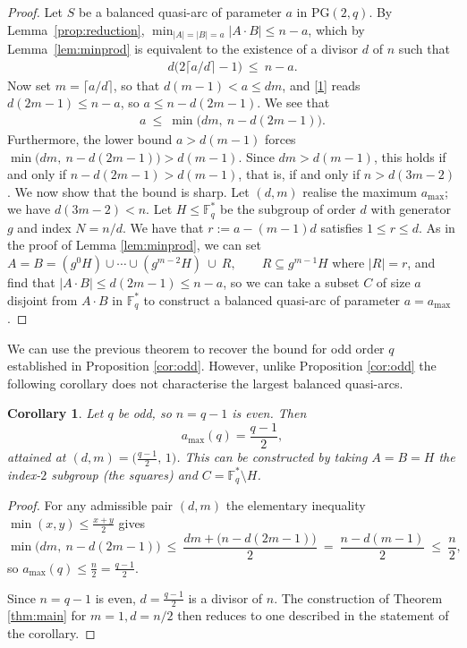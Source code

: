 \documentclass{article}
\newtheorem{corollary}{Corollary}
\newcommand{\PG}{\mathrm{PG}}
\newcommand{\F}{\mathbb{F}}
\begin{document}
\begin{proof} Let $S$ be a balanced quasi-arc of parameter
$a$ in $\PG(2,q)$. By Lemma~\ref{prop:reduction}, $\min_{|A|=|B|=a}|A\cdot B|\le n-a$, which by
Lemma~\ref{lem:minprod} is equivalent to the existence of a divisor $d$ of $n$ such that 
\begin{align}d\bigl(2\lceil a/d\rceil-1\bigr)\ \le\ n-a \label{1}.\end{align}
Now set $m=\lceil a/d\rceil$, so that
  $d(m-1)<a\le dm$, and \eqref{1} reads $d(2m-1)\le n-a$, so $a\le n-d(2m-1)$. We see that
\begin{align}
  a\ \le\ \min\bigl(dm,\ n-d(2m-1)\bigr). \label{2}
\end{align}
Furthermore, the lower bound $a>d(m-1)$ forces $\min\bigl(dm,\ n-d(2m-1)\bigr)>d(m-1)$. Since $dm>d(m-1)$, this holds if
and only if $
  n-d(2m-1)>d(m-1)$, that is, if and only if $
  n>d(3m-2)$. 
We now show that the bound is sharp. Let $(d,m)$ realise the maximum $a_{\max}$; we have $d(3m-2)<n$. Let $H\le \F_q^\ast$ be the subgroup of
order $d$ with generator $g$ and index $N=n/d$. We have that $r:=a-(m-1)d$ satisfies $1\le r\le d$. As in the proof of Lemma \ref{lem:minprod}, we can
 set
$
  A=B=(g^0H)\cup\cdots\cup(g^{m-2}H)\ \cup\ R,\qquad R\subseteq g^{m-1}H$ where $|R|=r$,
and find that $  |A\cdot B|\leq d(2m-1)\leq n-a$, so we can take a subset $C$ of size $a$ disjoint from $A\cdot B$ in $\F_q^\ast $ to construct a balanced quasi-arc of parameter $a=a_{\max}$.
\end{proof}

We can use the previous theorem to recover the bound for odd order $q$ established in Proposition \ref{cor:odd}. However, unlike Proposition \ref{cor:odd} the following corollary does not characterise the largest balanced quasi-arcs.

\begin{corollary}
Let $q$ be odd, so $n=q-1$ is even. Then
\[
  a_{\max}(q)=\frac{q-1}{2},
\]
attained at $(d,m)=\bigl(\tfrac{q-1}{2},\,1\bigr)$. This can be constructed by taking $A=B=H$ the
index-$2$ subgroup (the squares) and $C=\F_q^\ast\setminus H$.
\end{corollary}

\begin{proof}
For any admissible pair $(d,m)$ the elementary inequality $\min(x,y)\le\frac{x+y}{2}$ gives
\[
  \min\bigl(dm,\ n-d(2m-1)\bigr)
  \ \le\ \frac{dm+\bigl(n-d(2m-1)\bigr)}{2}
  \ =\ \frac{n-d(m-1)}{2}\ \le\ \frac{n}{2},
\]
so $a_{\max}(q)\le\frac{n}{2}=\frac{q-1}{2}$.

Since $n=q-1$ is even, $d=\frac{q-1}{2}$ is a
divisor of $n$. The construction of Theorem \ref{thm:main} for $m=1,d=n/2$ then reduces to one described in the statement of the corollary.
\end{proof}
\end{document}
